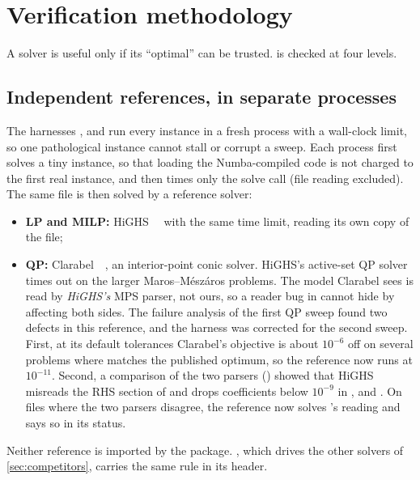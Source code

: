 \section{Verification methodology}\label{sec:verification}

A solver is useful only if its ``optimal'' can be trusted. \nirnay{} is checked at four levels.

\subsection{Independent references, in separate processes}
The harnesses ,  and  run every instance
in a fresh process with a wall-clock limit, so one pathological instance cannot stall or corrupt a
sweep. Each process first solves a tiny instance, so that loading the Numba-compiled code is not
charged to the first real instance, and then times only the solve call (file reading excluded).
The same file is then solved by a reference solver:
\begin{itemize}
  \item \textbf{LP and MILP:} HiGHS~\verHighs~\cite{huangfu2018} with the same time limit, reading its
        own copy of the file;
  \item \textbf{QP:} Clarabel~\verClarabel~\cite{goulart2024}, an interior-point conic solver. HiGHS's
        active-set QP solver times out on the larger Maros--Mészáros problems. The model Clarabel sees
        is read by \emph{HiGHS's} MPS parser, not ours, so a reader bug in \nirnay{} cannot hide by
        affecting both sides. The failure analysis of the first QP sweep found two defects in this
        reference, and the harness was corrected for the second sweep. First, at its default
        tolerances Clarabel's objective is about $10^{-6}$ off on several problems where \nirnay{}
        matches the published optimum, so the reference now runs at $10^{-11}$. Second, a comparison of
        the two parsers () showed that HiGHS~\verHighs{} misreads the RHS
        section of  and drops coefficients below $10^{-9}$ in ,
         and . On files where the two parsers disagree, the reference now
        solves \nirnay{}'s reading and says so in its status.
\end{itemize}
Neither reference is imported by the  package. , which drives
the other solvers of \cref{sec:competitors}, carries the same rule in its header.

